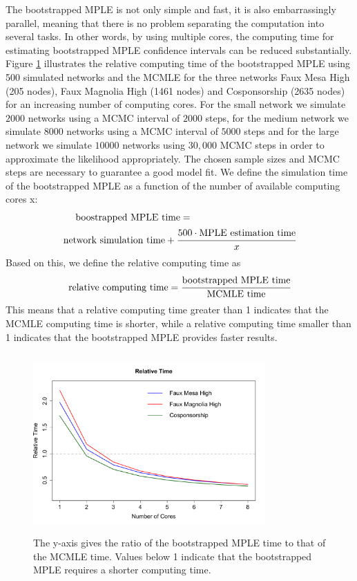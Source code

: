 \documentclass[10pt, conference, compsocconf]{IEEEtran}
\begin{document}
\noindent The bootstrapped MPLE is not only simple and fast, it is also embarrassingly parallel, meaning that there is no problem separating the computation into several tasks. In other words, by using multiple cores, the computing time for estimating bootstrapped MPLE confidence intervals can be reduced substantially. Figure \ref{comptime} illustrates the relative computing time of the bootstrapped MPLE using 500 simulated networks and the MCMLE for the three networks Faux Mesa High (205 nodes), Faux Magnolia High (1461 nodes) and Cosponsorship (2635 nodes) for an increasing number of computing cores. For the small network we simulate $2000$ networks using a MCMC interval of $2000$ steps, for the medium network we simulate $8000$ networks using a MCMC interval of $5000$ steps and for the large network we simulate $10000$ networks using $30,000$ MCMC steps in order to approximate the likelihood appropriately. The chosen sample sizes and MCMC steps are necessary to guarantee a good model fit. We define the simulation time of the bootstrapped MPLE as a function of the number of available computing cores x:
\begin{equation*}
\begin{split}
\text{boostrapped MPLE time} = ~~~~~~~~~~~~~~~~~~~~~~~~~~~~~~~~~ \\ \text{network simulation time} + \cfrac{500 \cdot \text{MPLE estimation time}}{x}
\end{split}
\end{equation*}     
Based on this, we define the relative computing time as
$$\text{relative computing time}= \cfrac{\text{bootstrapped MPLE time}}{\text{MCMLE time}}$$
This means that a relative computing time greater than 1 indicates that the MCMLE computing time is shorter, while a relative computing time smaller than 1 indicates that the bootstrapped MPLE provides faster results. \\[0.3cm]
\begin{figure}[!t]
\centering
\includegraphics[width=3.5in, height=2.7in]{rel_time}
\caption{The y-axis gives the ratio of the bootstrapped MPLE time to that of the MCMLE time. Values below 1 indicate that the bootstrapped MPLE requires a shorter computing time.}
\label{comptime}
\end{figure}
\end{document}
